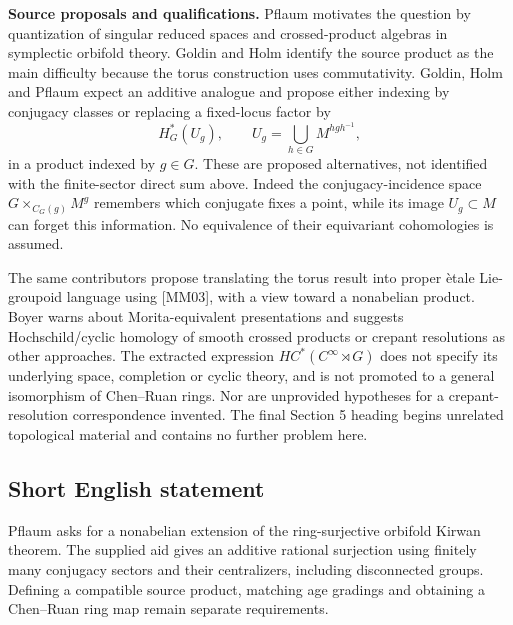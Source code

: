 \documentclass[11pt]{article}
\begin{document}
\textbf{Source proposals and qualifications.} Pflaum motivates the question by quantization of singular reduced spaces and crossed-product algebras in symplectic orbifold theory. Goldin and Holm identify the source product as the main difficulty because the torus construction uses commutativity. Goldin, Holm and Pflaum expect an additive analogue and propose either indexing by conjugacy classes or replacing a fixed-locus factor by
\[
 H_G^*(U_g),\qquad U_g=\bigcup_{h\in G}M^{hgh^{-1}},
\]
in a product indexed by $g\in G$. These are proposed alternatives, not identified with the finite-sector direct sum above. Indeed the conjugacy-incidence space $G\times_{C_G(g)}M^g$ remembers which conjugate fixes a point, while its image $U_g\subset M$ can forget this information. No equivalence of their equivariant cohomologies is assumed.

The same contributors propose translating the torus result into proper \`etale Lie-groupoid language using [MM03], with a view toward a nonabelian product. Boyer warns about Morita-equivalent presentations and suggests Hochschild/cyclic homology of smooth crossed products or crepant resolutions as other approaches. The extracted expression $HC^*(C^\infty\mathbin{\rtimes}G)$ does not specify its underlying space, completion or cyclic theory, and is not promoted to a general isomorphism of Chen--Ruan rings. Nor are unprovided hypotheses for a crepant-resolution correspondence invented. The final Section 5 heading begins unrelated topological material and contains no further problem here.
\subsection{Short English statement}
Pflaum asks for a nonabelian extension of the ring-surjective orbifold Kirwan theorem. The supplied aid gives an additive rational surjection using finitely many conjugacy sectors and their centralizers, including disconnected groups. Defining a compatible source product, matching age gradings and obtaining a Chen--Ruan ring map remain separate requirements.
\end{document}
